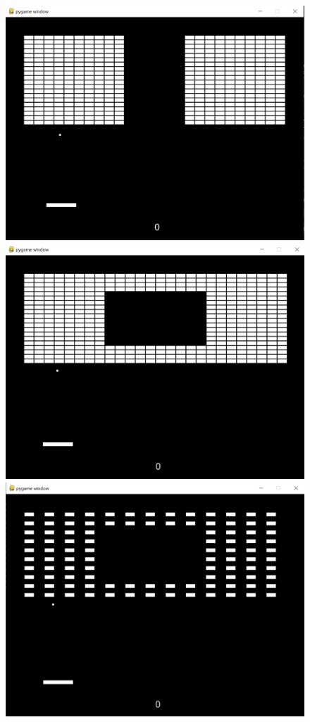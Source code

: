 \documentclass[twoside,11pt]{article}
\begin{document}
\begin{figure}[H]
\includegraphics[scale=0.2]{layout5}
\includegraphics[scale=0.2]{layout6}
\includegraphics[scale=0.2]{layout7}
\centering

\end{figure}
\end{document}
